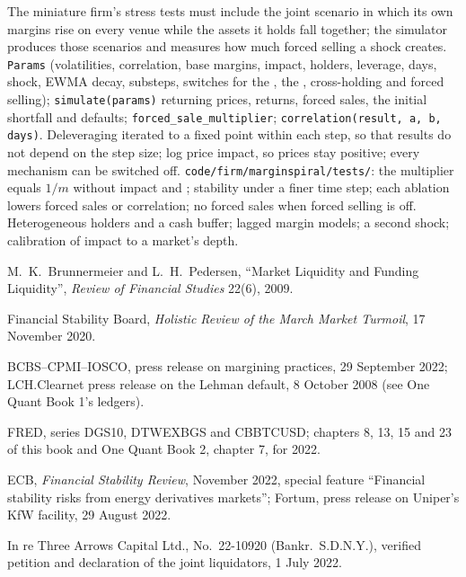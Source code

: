 \begin{build}
 The miniature firm's stress tests must include the joint scenario in which its own margins rise on every venue while the assets it holds fall
together; the simulator produces those scenarios and measures how much forced selling a shock creates.
 \texttt{Params} (volatilities, correlation, base margins, impact, holders, leverage, days, shock, EWMA decay, substeps, switches for the , the , cross-holding and forced selling); \texttt{simulate(params)} returning prices, returns, forced sales, the initial shortfall and
defaults; \texttt{forced\_sale\_multiplier}; \texttt{correlation(result, a, b, days)}.
 Deleveraging iterated to a fixed point within each step, so that results do not depend on the step size; log price impact, so prices stay
positive; every mechanism can be switched off.
 \texttt{code/firm/marginspiral/tests/}: the multiplier equals $1/m$ without impact and ; stability under a finer time step;
each ablation lowers forced sales or correlation; no forced sales when forced selling is off.
 Heterogeneous holders and a cash buffer; lagged margin models; a second shock; calibration of impact to a market's depth.
\end{build}

\begin{omsources}
\item M.~K.~Brunnermeier and L.~H.~Pedersen, ``Market Liquidity and Funding Liquidity'', \emph{Review of Financial Studies} 22(6), 2009.
\item Financial Stability Board, \emph{Holistic Review of the March Market Turmoil}, 17 November 2020.
\item BCBS--CPMI--IOSCO, press release on margining practices, 29 September 2022; LCH.Clearnet press release on the Lehman default, 8 October 2008 (see One
Quant Book 1's ledgers).
\item FRED, series DGS10, DTWEXBGS and CBBTCUSD; chapters 8, 13, 15 and 23 of this book and One Quant Book 2, chapter 7, for 2022.
\item ECB, \emph{Financial Stability Review}, November 2022, special feature ``Financial stability risks from energy derivatives markets''; Fortum, press
release on Uniper's KfW facility, 29 August 2022.
\item In re Three Arrows Capital Ltd., No.\ 22-10920 (Bankr.\ S.D.N.Y.), verified petition and declaration of the joint liquidators, 1 July 2022.
\end{omsources}

